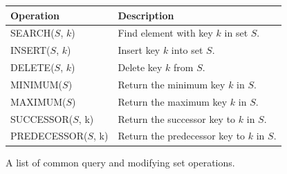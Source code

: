 \documentclass[10pt,a4paper]{article}
\begin{document}
\begin{figure}
\caption{A list of common query and modifying set operations.}
\begin{center}
\begin{tabular}{| l | l | }
  \hline
  Operation & Description \\
  \hline
  SEARCH($S$, $k$) & Find element with key $k$ in set $S$. \\
  INSERT($S$, $k$) & Insert key $k$ into set $S$. \\
  DELETE($S$, $k$) & Delete key $k$ from $S$. \\
  MINIMUM($S$) & Return the minimum key $k$ in $S$. \\
  MAXIMUM($S$) & Return the maximum key $k$ in $S$. \\
  SUCCESSOR($S$, k) & Return the successor key to $k$ in $S$. \\
  PREDECESSOR($S$, k) & Return the predecessor key to $k$ in $S$. \\
  \hline
\end{tabular}
\end{center}
\label{operations}
\end{figure}
\end{document}
